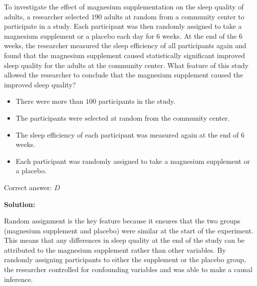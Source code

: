 \documentclass{article}
\begin{document}
\vspace{1cm}

\begin{tcolorbox}[colback=blue!5!white, colframe=blue!75!black, title=Question 16]
To investigate the effect of magnesium supplementation on the sleep quality of adults, a researcher selected \(190\) adults at random from a community center to participate in a study.
Each participant was then randomly assigned to take a magnesium supplement or a placebo each day for \(6\) weeks.
At the end of the \(6\) weeks, the researcher measured the sleep efficiency of all participants again and found that the magnesium supplement caused statistically significant improved sleep quality for the adults at the community center.
What feature of this study allowed the researcher to conclude that the magnesium supplement caused the improved sleep quality?

\begin{itemize}
    \item[A.] There were more than \(100\) participants in the study.
    \item[B.] The participants were selected at random from the community center.
    \item[C.] The sleep efficiency of each participant was measured again at the end of \(6\) weeks.
    \item[D.] Each participant was randomly assigned to take a magnesium supplement or a placebo.
\end{itemize}
\end{tcolorbox}

\begin{tcolorbox}[colback=green!10, colframe=green!50!black, title=Answer]
Correct answer: \(D\)

\textbf{Solution:}

Random assignment is the key feature because it ensures that the two groups (magnesium supplement and placebo) were similar at the start of the experiment.
This means that any differences in sleep quality at the end of the study can be attributed to the magnesium supplement rather than other variables.
By randomly assigning participants to either the supplement or the placebo group, the researcher controlled for confounding variables and was able to make a causal inference.
\end{tcolorbox}

\vspace{1cm}
\end{document}
